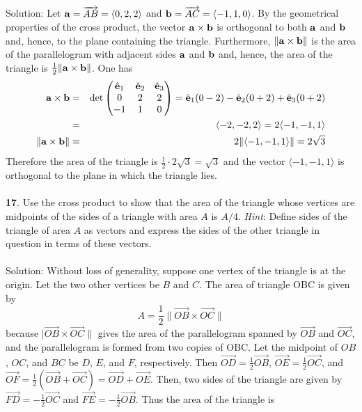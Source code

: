 \documentclass[12pt]{amsbook}
\begin{document}
{\sc Solution}: Let 
${\bf a}=\overrightarrow{AB}=\langle0,2,2\rangle$ and 
${\bf b}=\overrightarrow{AC}=\langle-1,1,0\rangle$.
By the geometrical properties of the cross product,
the vector ${\bf a}\times{\bf b}$ is orthogonal to 
both ${\bf a}$ and ${\bf b}$ and, hence, to the plane
containing the triangle. Furthermore, $\|{\bf a}\times{\bf b}\|$
is the area of the parallelogram with adjacent sides 
${\bf a}$ and ${\bf b}$ and, hence, the area of the 
triangle is $\frac 12 \|{\bf a}\times{\bf b}\|$.
One has
\begin{eqnarray*}
{\bf a}\times{\bf b}&=&\det\begin{pmatrix}\hat{\bf e}_1 &
\hat{\bf e}_2& \hat{\bf e}_3\cr
0&2&2\cr -1&1&0\end{pmatrix}=
\hat{\bf e}_1 (0-2)-\hat{\bf e}_2(0+2)+\hat{\bf e}_3(0+2)\\
&=&
\langle -2,-2,2\rangle =2\langle -1,-1,1\rangle\\
\|{\bf a}\times{\bf b}\|&=&2\|\langle -1,-1,1\rangle\|=
2\sqrt{3}
\end{eqnarray*} 
Therefore the area of the triangle is $\frac 12 \cdot 2\sqrt{3}=
\sqrt{3}$ and the vector $\langle -1,-1,1\rangle$ is 
orthogonal to the plane in which the triangle lies.\\
\\
{\small\bf 17}. 
Use the cross product to show that the area of the 
triangle whose vertices are midpoints of the sides
of a triangle with area $A$ is $A/4$. {\it Hint}: Define sides
of the triangle of area $A$ as vectors and express the sides 
of the other triangle in question in terms of these vectors. \\
\\
{\sc Solution}:
Without loss of generality, suppose one vertex of the triangle is at the origin. Let the two other vertices be $B$ and $C$. The area of triangle OBC is given by
$$A=\frac 12\|\overrightarrow{OB}\times\overrightarrow{OC}\|$$
because $|\overrightarrow{OB}\times\overrightarrow{OC}\|$ gives the area of the parallelogram spanned by $\overrightarrow{OB}$ and $\overrightarrow{OC}$, and the parallelogram is formed from two copies of OBC.
Let the midpoint of $OB$, $OC$, and $BC$ be $D$, $E$, and $F$, respectively. Then $\overrightarrow{OD}=\frac 12\overrightarrow{OB}$, $\overrightarrow{OE}=\frac 12\overrightarrow{OC}$, and $\overrightarrow{OF}=\frac 12(\overrightarrow{OB}+\overrightarrow{OC})=\overrightarrow{OD}+\overrightarrow{OE}$. Then, two sides of the triangle are given by $\overrightarrow{FD}=-\frac 12\overrightarrow{OC}$ and $\overrightarrow{FE}=-\frac 12\overrightarrow{OB}$. Thus the area of the triangle is 
\end{document}
